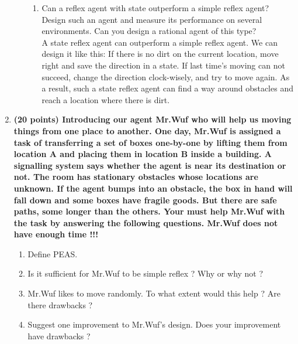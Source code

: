 \documentclass{article}%
\begin{document}
\begin{enumerate}
\begin{enumerate}
\begin{enumerate}
	\item Can a reflex agent with state outperform a simple reflex agent? Design such an agent and measure its performance on several environments. Can you design a rational agent of this type? \\
	A state reflex agent can outperform a simple reflex agent. We can design it like this: If there is no dirt on the current location, move right and save the direction in a state. If last time's moving can not succeed, change the direction clock-wisely, and try to move again. As a result, such a state reflex agent can find a way around obstacles and reach a location where there is dirt.
	\end{enumerate}

\end{enumerate}


\item \textbf{(20 points) Introducing our agent Mr.Wuf who will help us moving things from one place to another. One day, Mr.Wuf is assigned a task of transferring a set of boxes one-by-one by lifting them from location A and placing them in location B inside a building. A signalling system says whether the agent is near its destination or not. The room has stationary obstacles whose locations are unknown. If the agent bumps into an obstacle, the box in hand will fall down and some boxes have fragile goods. But there are safe paths, some longer than the others. Your must help Mr.Wuf with the task by answering the following questions. Mr.Wuf does not have enough time !!!}

	\begin{enumerate}
	\item Define PEAS.
	\item Is it sufficient for Mr.Wuf to be simple reflex ? Why or why not ?
	\item Mr.Wuf likes to move randomly. To what extent would this help ? Are there drawbacks ?
	\item Suggest one improvement to Mr.Wuf's design. Does your improvement have drawbacks ?
	\end{enumerate}
	

\end{enumerate}
\end{document}
